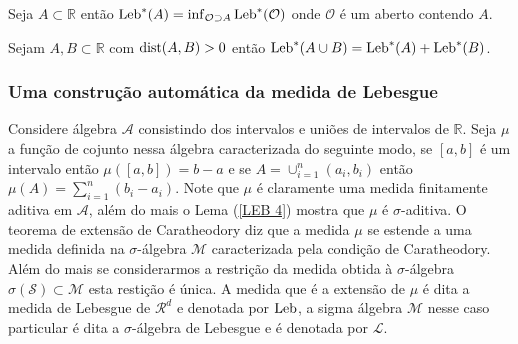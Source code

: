 
\begin{proposicao}
Seja $A\subset \mathbb{R}$ então $ \textnormal{Leb}^{*}(A)=\inf_{\mathcal{O}\supset A}\textnormal{Leb}^{*}(\mathcal{O})$ onde $\mathcal{O}$ é um aberto contendo $A$.
\end{proposicao}


\begin{proposicao}
Sejam $A,B\subset \mathbb{R}$ com $\textnormal{dist}(A,B)>0$ então $\textnormal{Leb}^{*}(A\cup B)=\textnormal{Leb}^{*}(A)+\textnormal{Leb}^{*}(B)$.
\end{proposicao}



\subsubsection{Uma construç\~ao autom\'atica da medida de Lebesgue}


Considere álgebra $\mathcal{A}$ consistindo dos intervalos e uniões de intervalos de   $\mathbb{R}.$ Seja  $\mu$ a  função de cojunto  nessa álgebra caracterizada do seguinte modo, se $[a,b]$ é um intervalo  então $\mu([a,b])=b-a$ e se $A=\cup_{i=1}^n(a_i,b_i)$ então $\mu(A)=\sum_{i=1}^n(b_i-a_i).$  Note que $\mu$ é claramente uma medida finitamente aditiva em $\mathcal{A}$, além do mais o Lema (\ref{LEB 4}) mostra que $\mu$ é $\sigma$-aditiva. 
O teorema de extensão de Caratheodory diz que a medida $\mu$ se estende a uma medida definida na $\sigma$-álgebra  $\mathcal{M}$  caracterizada pela condição de Caratheodory. Além do mais se considerarmos a restrição da medida obtida  à $\sigma$-álgebra $\sigma(\mathcal{S})\subset \mathcal{M}$ esta restição é única. A medida que é a extensão de $\mu$ é dita a medida de Lebesgue de $\mathcal{R}^d$ e denotada por $\textnormal{Leb}$, a sigma álgebra $\mathcal{M}$ nesse caso particular é dita a $\sigma$-álgebra de Lebesgue e é denotada por $\mathcal{L}$.






































